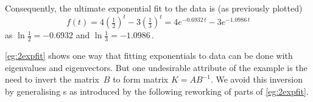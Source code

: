 \begin{example}
\begin{solution}
Consequently, the ultimate exponential fit to the data is (as previously plotted)
\begin{equation*}
f(t)=4(\tfrac12)^t-3(\tfrac13)^t
=4e^{-0.6932\,t}-3e^{-1.0986\,t}
\end{equation*}
as \(\ln\frac12=-0.6932\) and \(\ln \frac13=-1.0986\)\,.
\end{solution}
\end{example}



\autoref{eg:2expfit} shows one way that fitting exponentials to data can be done with eigenvalues and eigenvectors.
But one undesirable attribute of the example is the need to invert the matrix~\(B\) to form matrix \(K=AB^{-1}\).
We avoid this inversion by generalising s as introduced by the following reworking of parts of \autoref{eg:2expfit}.

